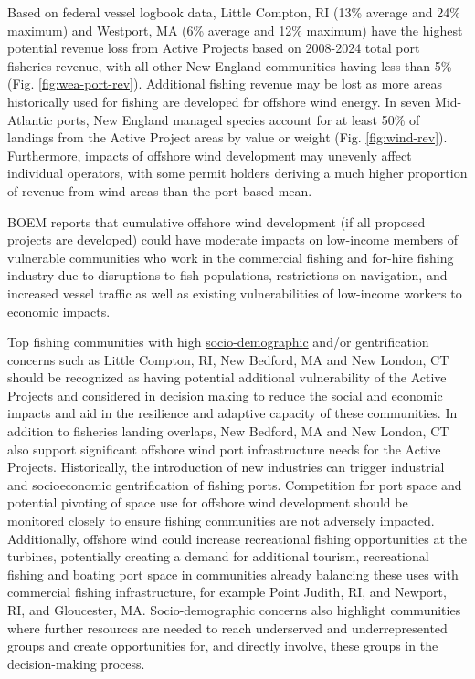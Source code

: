 \documentclass[
  10pt,
]{article}
\begin{document}
Based on federal vessel logbook data, Little Compton, RI (13\% average and 24\% maximum) and Westport, MA (6\% average and 12\% maximum) have the highest potential revenue loss from Active Projects based on 2008-2024 total port fisheries revenue, with all other New England communities having less than 5\% (Fig. \ref{fig:wea-port-rev}). Additional fishing revenue may be lost as more areas historically used for fishing are developed for offshore wind energy. In seven Mid-Atlantic ports, New England managed species account for at least 50\% of landings from the Active Project areas by value or weight (Fig. \ref{fig:wind-rev}). Furthermore, impacts of offshore wind development may unevenly affect individual operators, with some permit holders deriving a much higher proportion of revenue from wind areas than the port-based mean.

BOEM reports that cumulative offshore wind development (if all proposed projects are developed) could have moderate impacts on low-income members of vulnerable communities who work in the commercial fishing and for-hire fishing industry due to disruptions to fish populations, restrictions on navigation, and increased vessel traffic as well as existing vulnerabilities of low-income workers to economic impacts.

Top fishing communities with high \href{https://noaa-edab.github.io/catalog/engagement.html}{socio-demographic} and/or gentrification concerns such as Little Compton, RI, New Bedford, MA and New London, CT should be recognized as having potential additional vulnerability of the Active Projects and considered in decision making to reduce the social and economic impacts and aid in the resilience and adaptive capacity of these communities. In addition to fisheries landing overlaps, New Bedford, MA and New London, CT also support significant offshore wind port infrastructure needs for the Active Projects. Historically, the introduction of new industries can trigger industrial and socioeconomic gentrification of fishing ports. Competition for port space and potential pivoting of space use for offshore wind development should be monitored closely to ensure fishing communities are not adversely impacted. Additionally, offshore wind could increase recreational fishing opportunities at the turbines, potentially creating a demand for additional tourism, recreational fishing and boating port space in communities already balancing these uses with commercial fishing infrastructure, for example Point Judith, RI, and Newport, RI, and Gloucester, MA. Socio-demographic concerns also highlight communities where further resources are needed to reach underserved and underrepresented groups and create opportunities for, and directly involve, these groups in the decision-making process.
\end{document}
